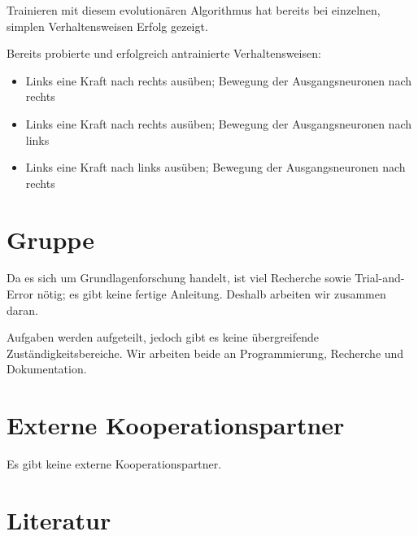 \documentclass[parskip]{scrartcl}
\begin{document}
Trainieren mit diesem evolutionären Algorithmus hat bereits bei einzelnen, simplen Verhaltensweisen Erfolg gezeigt.

Bereits probierte und erfolgreich antrainierte Verhaltensweisen:

\begin{itemize}
    \item Links eine Kraft nach rechts ausüben; Bewegung der Ausgangsneuronen nach rechts 
    \item Links eine Kraft nach rechts ausüben; Bewegung der Ausgangsneuronen nach links
    \item Links eine Kraft nach links ausüben; Bewegung der Ausgangsneuronen nach rechts
\end{itemize}

\section{Gruppe}

Da es sich um Grundlagenforschung handelt, ist viel Recherche sowie Trial-and-Error nötig; es gibt keine fertige Anleitung.
Deshalb arbeiten wir zusammen daran.

Aufgaben werden aufgeteilt, jedoch gibt es keine übergreifende Zuständigkeitsbereiche. Wir arbeiten beide an Programmierung, Recherche und Dokumentation.

\section{Externe Kooperationspartner}

Es gibt keine externe Kooperationspartner.

\section{Literatur}

\printbibliography
\end{document}
